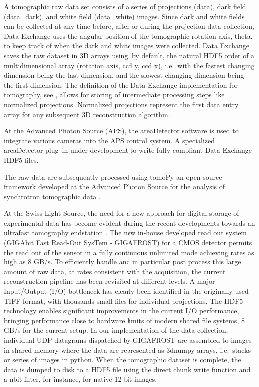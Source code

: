 \documentclass[pdf]{iucr}              %
\begin{document}
A tomographic raw data set consists of a series of projections (data), dark field (data\_dark), and white field (data\_white) images. Since dark and white fields can be collected at any time before, after or during the projection data collection, Data Exchange uses the angular position of the tomographic rotation axis, theta, to keep track of when the dark and white images were collected. Data Exchange saves the raw dataset in 3D arrays using, by default, the natural HDF5 order of a multidimensional array (rotation axis, ccd y, ccd x), i.e.\  with the fastest changing dimension being the last dimension, and the slowest changing dimension being the first dimension. The definition of the Data Exchange implementation for tomography, see \cite{data_exchange}, allows for storing of intermediate processing steps like normalized projections. Normalized projections represent the first data entry array for any subsequent 3D reconstruction algorithm.

At the Advanced Photon Source (APS), the areaDetector software \cite{area_detector} is used to integrate various cameras into the APS control system. A specialized areaDetector plug--in under development to write fully compliant Data Exchange HDF5 files. 

The raw data are subsequently processed using tomoPy an open source framework developed at the Advanced Photon Source for the analysis of synchrotron tomographic data \cite{python_cpp}.

At the Swiss Light Source, the need for a new approach for digital storage of experimental data has become evident during the recent developments towards an ultrafast tomography endstation \cite{mokso2010}. The new in-house developed read out system (GIGAbit Fast Read-Out SysTem - GIGAFROST) for a CMOS detector permits the read out of the sensor in a fully continuous unlimited mode achieving rates as high as 8 GB/s. To efficiently handle and in particular post process this large amount
of raw data, at rates consistent with the acquisition, the current reconstruction pipeline has been revisited at different levels. A major Input/Output (I/O) bottleneck has clearly been identified in the originally used TIFF format, with thousands small files for individual projections. The HDF5 technology enables significant improvements in the current I/O performance, bringing performance close to hardware limits of modern shared file systems, 8 GB/s for the current setup. In our implementation of the data collection, individual UDP datagrams dispatched by GIGAFROST are assembled to images in shared memory where the data are represented as 3dnumpy arrays, i.e.\ stacks or series of images in python. When the tomographic dataset is complete, the data is dumped to disk to a HDF5 file using the direct chunk write function \cite{donath2013} and a nbit-filter, for instance, for native 12 bit images.
\end{document}
